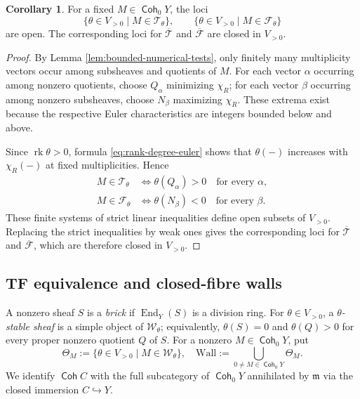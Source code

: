 \documentclass[a4paper,reqno]{amsart}
\def\F{\mathcal{F}}
\def\T{\mathcal{T}}
\def\W{\mathcal{W}}
\def\m{\mathfrak{m}}
\DeclareMathOperator{\Coh}{\mathsf{Coh}}
\DeclareMathOperator{\End}{End}
\DeclareMathOperator{\rk}{rk}
\theoremstyle{definition}
\newtheorem{Cor}[Thm]{Corollary}
\begin{document}
\begin{Cor}\label{cor:numerical-openness}
For a fixed $M\in\Coh_0Y$, the loci
\[
\{\theta\in V_{>0}\mid M\in\T_\theta\},
\qquad
\{\theta\in V_{>0}\mid M\in\F_\theta\}
\]
are open. The corresponding loci for $\overline{\T}$ and $\overline{\F}$ are closed in $V_{>0}$.
\end{Cor}
\begin{proof}
By Lemma \ref{lem:bounded-numerical-tests}, only finitely many multiplicity
vectors occur among subsheaves and quotients of $M$. For each vector
$\alpha$ occurring among nonzero quotients, choose $Q_\alpha$ minimizing
$\chi_R$; for each vector $\beta$ occurring among nonzero subsheaves,
choose $N_\beta$ maximizing $\chi_R$. These extrema exist because the
respective Euler characteristics are integers bounded below and above.

Since $\rk\theta>0$, formula \eqref{eq:rank-degree-euler} shows that
$\theta(-)$ increases with $\chi_R(-)$ at fixed multiplicities. Hence
\[
\begin{aligned}
M\in\T_\theta
&\Longleftrightarrow \theta(Q_\alpha)>0\quad\text{for every }\alpha,\\
M\in\F_\theta
&\Longleftrightarrow \theta(N_\beta)<0\quad\text{for every }\beta.
\end{aligned}
\]
These finite systems of strict linear inequalities define open subsets
of $V_{>0}$. Replacing the strict inequalities by weak ones gives the
corresponding loci for $\overline{\T}$ and $\overline{\F}$, which are
therefore closed in $V_{>0}$.
\end{proof}

\subsection{TF equivalence and closed-fibre walls}

A nonzero sheaf $S$ is a \emph{brick} if $\End_Y(S)$ is a division ring. For $\theta\in V_{>0}$, a \emph{$\theta$-stable sheaf} is a simple object of $\W_\theta$; equivalently, $\theta(S)=0$ and $\theta(Q)>0$ for every proper nonzero quotient $Q$ of $S$. For a nonzero $M\in\Coh_0Y$, put
\[
\Theta_M:=\{\theta\in V_{>0}\mid M\in\W_\theta\},
\quad
\mathrm{Wall}:=\bigcup_{0\ne M\in\Coh_0Y}\Theta_M.
\]
We identify $\Coh C$ with the full subcategory of $\Coh_0Y$ annihilated by $\m$ via the closed immersion $C\hookrightarrow Y$.
\end{document}
